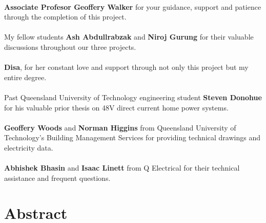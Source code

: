 \paragraph{}
\textbf{Associate Profesor Geoffery Walker} for your guidance, support and patience through the completion of this project. 

\paragraph{}
My fellow students \textbf{Ash Abdullrabzak} and \textbf{Niroj Gurung} for their valuable discussions throughout our three projects. 

\paragraph{}
\textbf{Disa}, for her constant love and support through not only this project but my entire degree.    

\paragraph{}
Past Queensland University of Technology engineering student \textbf{Steven Donohue} for his valuable prior thesis on 48V direct current home power systems.  

\paragraph{}
\textbf{Geoffery Woods} and \textbf{Norman Higgins} from Queensland University of Technology's Building Management Services for providing technical drawings and electricity data.

\paragraph{}
\textbf{Abhishek Bhasin} and \textbf{Isaac Linett} from Q Electrical for their technical assistance and frequent questions.

\newpage


\section*{Abstract}

